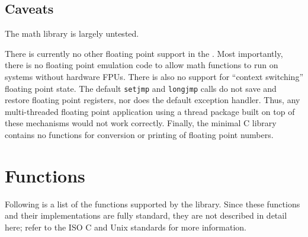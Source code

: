 \subsection{Caveats}
The \oskit{} math library is largely untested.

There is currently no other floating point support in the \oskit{}.
Most importantly, there is no floating point emulation code to allow
math functions to run on systems without hardware FPUs.
There is also no support for ``context switching'' floating point state.
The default {\tt setjmp} and {\tt longjmp} calls do not save and restore
floating point registers, nor does the default exception handler.
Thus, any multi-threaded floating point application using a thread package
built on top of these mechanisms would not work correctly.
Finally, the minimal C library contains no functions for conversion
or printing of floating point numbers.

\newpage
\section{Functions}

Following is a list of the functions supported by the library.
Since these functions and their implementations are fully standard,
they are not described in detail here;
refer to the ISO C and Unix standards for more information.

